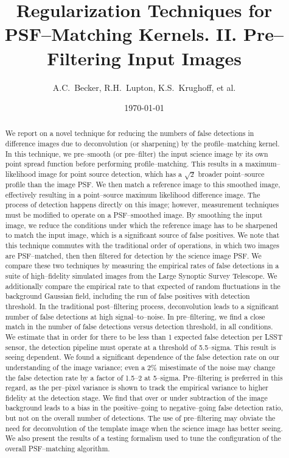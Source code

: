 \documentclass[floatfix, apj]{emulateapj}
\begin{document}
\title{Regularization Techniques for PSF--Matching Kernels. II. Pre--Filtering Input Images}

\author{
A.C.~Becker,
R.H.~Lupton,
K.S.~Krughoff,
et al.
}

\date{\today}

\begin{abstract}

We report on a novel technique for reducing the numbers of false detections in difference images due to deconvolution (or sharpening) by the profile--matching kernel.
In this technique, we pre--smooth (or pre--filter) the input science image by its own point spread function before performing profile--matching.
This results in a maximum--likelihood image for point source detection, which has a $\sqrt{2}$ broader point--source profile than the image PSF.
We then match a reference image to this smoothed image, effectively resulting in a point--source maximum likelihood difference image.
The process of detection happens directly on this image; however, measurement techniques must be modified to operate on a PSF--smoothed image.
By smoothing the input image, we reduce the conditions under which the reference image has to be sharpened to match the input image, which is a significant source of false positives.
We note that this technique commutes with the traditional order of operations, in which two images are PSF--matched, then then filtered for detection by the science image PSF.
We compare these two techniques by measuring the empirical rates of false detections in a suite of high--fidelity simulated images from the Large Synoptic Survey Telescope.
We additionally compare the empirical rate to that expected of random fluctuations in the background Gaussian field, including the run of false positives with detection threshold.
In the traditional post--filtering process, deconvolution leads to a significant number of false detections at high signal--to--noise.
In pre--filtering, we find a close match in the number of false detections versus detection threshold, in all conditions.
We estimate that in order for there to be less than 1 expected false detection per LSST sensor, the detection pipeline must operate at a threshold of 5.5--sigma.
This result is seeing dependent.
We found a significant dependence of the false detection rate on our understanding of the image variance; even a 2\% misestimate of the noise may change the false detection rate by a factor of 1.5--2 at 5--sigma.
Pre--filtering is preferred in this regard, as the per--pixel variance is shown to track the empirical variance to higher fidelity at the detection stage.
We find that over or under subtraction of the image background leads to a bias in the positive--going to negative--going false detection ratio, but not on the overall number of detections.
The use of pre--filtering may obviate the need for deconvolution of the template image when the science image has better seeing.
We also present the results of a testing formalism used to tune the configuration of the overall PSF--matching algorithm.
\end{abstract}
\end{document}
